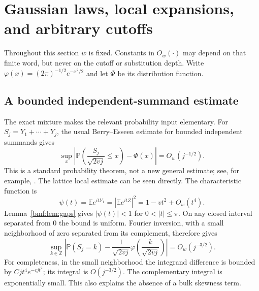 \documentclass[11pt]{article}
\numberwithin{equation}{section}
\theoremstyle{definition}
\theoremstyle{remark}
\newcommand{\Z}{\mathbb{Z}}
\newcommand{\E}{\mathbb E}
\newcommand{\Prob}{\mathbb P}
\newcommand{\ph}{\varphi}
\begin{document}
\section{Gaussian laws, local expansions, and arbitrary cutoffs}\label{bmf:sec:gaussian}

Throughout this section $w$ is fixed. Constants in $O_w(\cdot)$ may
depend on that finite word, but never on the cutoff or substitution
depth. Write $\ph(x)=(2\pi)^{-1/2}e^{-x^2/2}$ and let $\Phi$ be
its distribution function.

\subsection{A bounded independent-summand estimate}

The exact mixture makes the relevant probability input elementary.
For $S_j=Y_1+\cdots+Y_j$, the usual Berry--Esseen estimate for
bounded independent summands gives
\begin{equation}\label{bmf:eq:iid-be}
 \sup_x\left|
 \Prob\left(\frac{S_j}{\sqrt{2vj}}\leq x\right)-\Phi(x)
 \right|=O_w(j^{-1/2}).
\end{equation}
This is a standard probability theorem, not a new general estimate;
see, for example, \cite[Chapter XVI]{feller}.
The lattice local estimate can be seen directly. The characteristic
function is
\[
 \psi(t)=\E e^{itY_1}=|\E e^{itZ}|^2
       =1-vt^2+O_w(t^4).
\]
Lemma~\ref{bmf:lem:gaps} gives $|\psi(t)|<1$ for
$0<|t|\leq\pi$. On any closed interval separated from $0$ the
bound is uniform. Fourier inversion, with a small neighborhood of
zero separated from its complement, therefore gives
\begin{equation}\label{bmf:eq:iid-local}
 \sup_{k\in\Z}\left|
 \Prob(S_j=k)-\frac1{\sqrt{2vj}}
       \ph\left(\frac{k}{\sqrt{2vj}}\right)
 \right|=O_w(j^{-3/2}).
\end{equation}
For completeness, in the small neighborhood the integrand difference
is bounded by
$Cj t^4e^{-cjt^2}$; its integral is $O(j^{-3/2})$.
The complementary integral is exponentially small. This also
explains the absence of a bulk skewness term.
\end{document}
